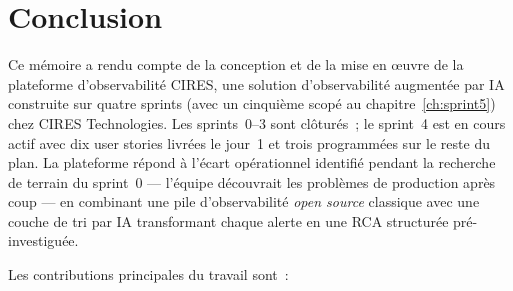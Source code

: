 \documentclass[11pt,a4paper,oneside]{report}
\begin{document}
\chapter{Conclusion}
\label{ch:conclusion}

Ce mémoire a rendu compte de la conception et de la mise en
\oe{}uvre de la plateforme d'observabilité CIRES, une solution
d'observabilité augmentée par IA construite sur quatre sprints
(avec un cinquième scopé au chapitre~\ref{ch:sprint5}) chez CIRES
Technologies. Les sprints~0--3 sont clôturés~; le sprint~4 est en
cours actif avec dix user stories livrées le jour~1 et trois
programmées sur le reste du plan. La plateforme répond à l'écart
opérationnel identifié pendant la recherche de terrain du sprint~0
--- l'équipe découvrait les problèmes de production après coup ---
en combinant une pile d'observabilité \emph{open source} classique
avec une couche de tri par IA transformant chaque alerte en une
RCA structurée pré-investiguée.

Les contributions principales du travail sont~:
\end{document}
